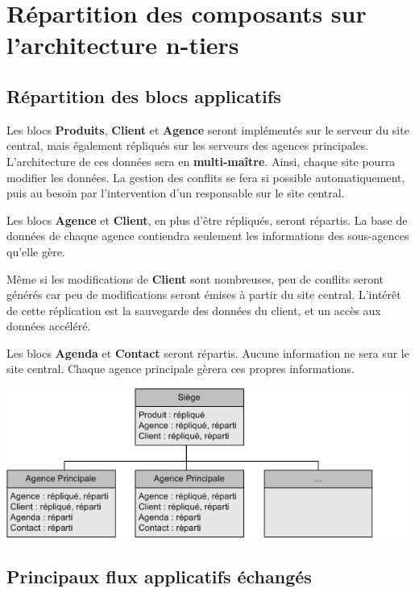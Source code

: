 
\section{Répartition des composants sur l'architecture n-tiers}

\subsection{Répartition des blocs applicatifs}

Les blocs \textbf{Produits}, \textbf{Client} et \textbf{Agence} seront implémentés sur le serveur du site central, mais également répliqués sur les serveurs des agences principales. L'architecture de ces données sera en \textbf{multi-maître}. Ainsi, chaque site pourra modifier les données. La gestion des conflits se fera si possible automatiquement, puis au besoin par l'intervention d'un responsable sur le site central.

Les blocs \textbf{Agence} et \textbf{Client}, en plus d'être répliqués, seront répartis. La base de données de chaque agence contiendra seulement les informations des sous-agences qu'elle gère.

Même si les modifications de \textbf{Client} sont nombreuses, peu de conflits seront générés car peu de modifications seront émises à partir du site central. L'intérêt de cette réplication est la sauvegarde des données du client, et un accès aux données accéléré.

Les blocs \textbf{Agenda} et \textbf{Contact} seront répartis. Aucune information ne sera sur le site central. Chaque agence principale gèrera ces propres informations.

\begin {center}
\includegraphics[width=\textwidth]{repartition_bloc.png}
\end {center}

\subsection{Principaux flux applicatifs échangés}

